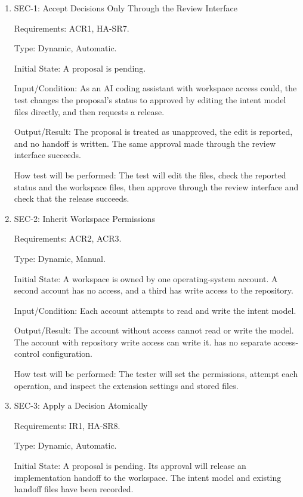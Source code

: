 \documentclass[12pt, titlepage]{article}
\begin{document}
\begin{enumerate}

\item{SEC-1: Accept Decisions Only Through the Review Interface\\}

Requirements: ACR1, HA-SR7.

Type: Dynamic, Automatic.

Initial State: A proposal is pending.

Input/Condition: As an AI coding assistant with workspace access could, the
test changes the proposal's status to approved by editing the intent model
files directly, and then requests a release.

Output/Result: The proposal is treated as unapproved, the edit is reported,
and no handoff is written. The same approval made through the review
interface succeeds.

How test will be performed: The test will edit the files, check the reported
status and the workspace files, then approve through the review interface and
check that the release succeeds.

\item{SEC-2: Inherit Workspace Permissions\\}

Requirements: ACR2, ACR3.

Type: Dynamic, Manual.

Initial State: A workspace is owned by one operating-system account. A second
account has no access, and a third has write access to the repository.

Input/Condition: Each account attempts to read and write the intent model.

Output/Result: The account without access cannot read or write the model. The
account with repository write access can write it. \progname{} has no separate
access-control configuration.

How test will be performed: The tester will set the permissions, attempt each
operation, and inspect the extension settings and stored files.

\item{SEC-3: Apply a Decision Atomically\\}

Requirements: IR1, HA-SR8.

Type: Dynamic, Automatic.

Initial State: A proposal is pending. Its approval will release an implementation
handoff to the workspace. The intent model and existing handoff files have been
recorded.


\end{enumerate}
\end{document}
